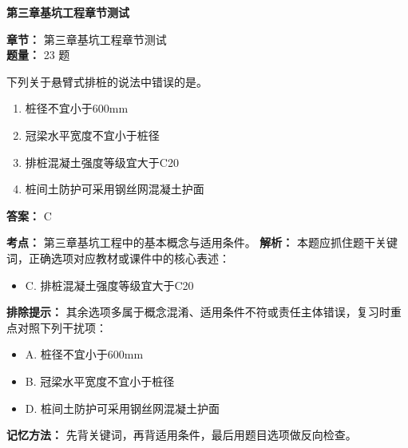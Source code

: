 \documentclass[UTF8,fontset=fandol,11pt]{ctexart}
\newcommand{\chaptertitle}[1]{\vspace{0.5em}\begin{tcolorbox}[enhanced,colback=deepblue,colframe=deepblue,arc=2mm,boxrule=0pt]\begin{center}\Large\bfseries\color{white}#1\end{center}\end{tcolorbox}\vspace{0.5em}}
\begin{document}
\chaptertitle{第三章基坑工程章节测试}
\begin{mainbox}
\textbf{\textcolor{mainblue}{章节：}} 第三章基坑工程章节测试\\
\textbf{\textcolor{answerred}{题量：}} 23 题
\end{mainbox}

\begin{quizbox}[title={第 1 题}]
下列关于悬臂式排桩的说法中错误的是。\\
\begin{enumerate}[label=\Alph*.]
\item 桩径不宜小于600mm
\item 冠梁水平宽度不宜小于桩径
\item 排桩混凝土强度等级宜大于C20
\item 桩间土防护可采用钢丝网混凝土护面
\end{enumerate}
\textbf{答案：} C
\vspace{0.25em}
\begin{answerbox}[title={考点解析}]
\textbf{考点：} 第三章基坑工程中的基本概念与适用条件。
\textbf{解析：} 本题应抓住题干关键词，正确选项对应教材或课件中的核心表述：
\begin{itemize}
\item C. 排桩混凝土强度等级宜大于C20
\end{itemize}
\textbf{排除提示：} 其余选项多属于概念混淆、适用条件不符或责任主体错误，复习时重点对照下列干扰项：
\begin{itemize}
\item A. 桩径不宜小于600mm
\item B. 冠梁水平宽度不宜小于桩径
\item D. 桩间土防护可采用钢丝网混凝土护面
\end{itemize}
\textbf{记忆方法：} 先背关键词，再背适用条件，最后用题目选项做反向检查。
\end{answerbox}
\end{quizbox}

\vspace{0.2em}
\end{document}
